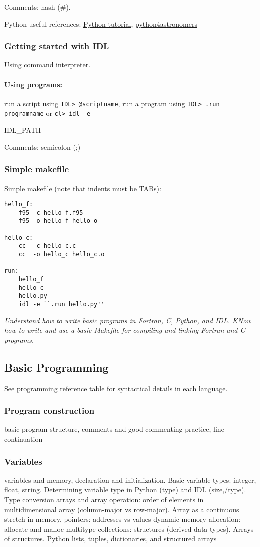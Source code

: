 \documentclass{article}
\newcommand{\test}[1]{%
    \begin{center}
        \colorbox{hl}{\parbox{0.9\textwidth}{\emph{#1}}}
    \end{center}}
\begin{document}
Comments: hash (\#).

Python useful references: \href{http://www.python-course.eu/course.php}
{Python tutorial},
\href{https://python4astronomers.github.io}{python4astronomers}


\subsubsection{Getting started with IDL}
Using command interpreter.
\paragraph{Using programs:}
run a script using \verb|IDL> @scriptname|, run a program using
\verb|IDL> .run programname| or
\verb|cl> idl -e|

IDL\_PATH

Comments: semicolon (;)
\subsubsection{Simple makefile}
Simple makefile (note that indents must be TABs):

\begin{verbatim}
hello_f:
    f95 -c hello_f.f95
    f95 -o hello_f hello_o

hello_c:
    cc  -c hello_c.c
    cc  -o hello_c hello_c.o

run:
    hello_f
    hello_c
    hello.py
    idl -e ``.run hello.py''
\end{verbatim}

\test{Understand how to write basic programs in Fortran, C,
Python, and IDL. KNow how to write and use a basic Makefile for
compiling and linking Fortran and C programs.}

\subsection{Basic Programming}
See \href{http://astronomy.nmsu.edu/holtz/a575/programming.html}
{programming reference table} for syntactical details in each
language.
\subsubsection{Program construction}
basic program structure,
comments and good commenting practice,
line continuation
\subsubsection{Variables}
variables and memory, declaration and initialization.
Basic variable types: integer, float, string. Determining variable
type in Python (type) and IDL (size,/type).
Type conversion
arrays and array operation: order of elements in multidimensional
array (column-major vs row-major). Array as a continuous stretch in
memory.
pointers: addresses vs values
dynamic memory allocation: allocate and malloc
multitype collections: structures (derived data types). Arrays of
structures. Python lists, tuples, dictionaries, and structured arrays
\end{document}
